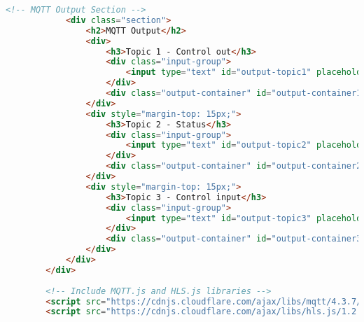 \begin{lstlisting}[language=html]
            <!-- MQTT Output Section -->
            <div class="section">
                <h2>MQTT Output</h2>
                <div>
                    <h3>Topic 1 - Control out</h3>
                    <div class="input-group">
                        <input type="text" id="output-topic1" placeholder="Output Topic 1" value="drone/output">
                    </div>
                    <div class="output-container" id="output-container1"></div>
                </div>
                <div style="margin-top: 15px;">
                    <h3>Topic 2 - Status</h3>
                    <div class="input-group">
                        <input type="text" id="output-topic2" placeholder="Output Topic 2" value="drone/status">
                    </div>
                    <div class="output-container" id="output-container2"></div>
                </div>
                <div style="margin-top: 15px;">
                    <h3>Topic 3 - Control input</h3>
                    <div class="input-group">
                        <input type="text" id="output-topic3" placeholder="Output Topic 3" value="drone/input">
                    </div>
                    <div class="output-container" id="output-container3"></div>
                </div>
            </div>
        </div>
    
        <!-- Include MQTT.js and HLS.js libraries -->
        <script src="https://cdnjs.cloudflare.com/ajax/libs/mqtt/4.3.7/mqtt.min.js"></script>
        <script src="https://cdnjs.cloudflare.com/ajax/libs/hls.js/1.2.4/hls.min.js"></script>
        

\end{lstlisting}
